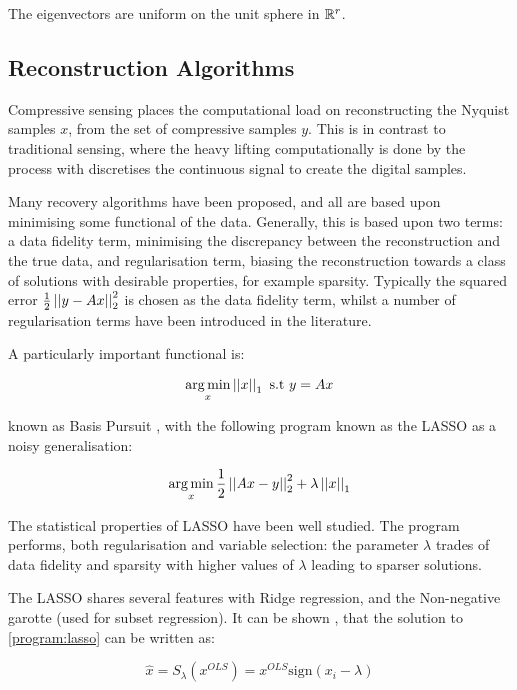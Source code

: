 The eigenvectors are uniform on the unit sphere in \({\mathbb{R}}^{r}\).

\subsection{Reconstruction Algorithms}
Compressive sensing places the computational load on reconstructing the Nyquist samples \(x\), from the set of compressive samples \(y\). This is in contrast to traditional sensing, where the heavy lifting computationally is done by the process with discretises the continuous signal to create the digital samples. 

Many recovery algorithms have been proposed, and all are based upon minimising some functional of the data. Generally, this is based upon two terms: a data fidelity term, minimising the discrepancy between the reconstruction and the true data, and regularisation term, biasing the reconstruction towards a class of solutions with desirable properties, for example sparsity. Typically the squared error \( \frac{1}{2}\left|\left|y-Ax\right|\right|_2^2 \) is chosen as the data fidelity term, whilst a number of regularisation terms have been introduced in the literature. 

A particularly important functional is:

\begin{equation}
\operatorname*{arg\,min}_x \left|\left|x\right|\right|_1 \text{ s.t } y=Ax
\label{program:bp}
\end{equation}

known as Basis Pursuit \cite{Chen1998a}, with the following program known as the LASSO \cite{tibshirani1996regression} as a noisy generalisation: 

\begin{equation}
\operatorname*{arg\,min}_x \frac{1}{2}\left|\left|Ax-y\right|\right|_2^2 + \lambda\left|\left|x\right|\right|_1
\label{program:lasso}
\end{equation}

The statistical properties of LASSO have been well studied. The program performs, both regularisation and variable selection: the parameter \(\lambda\) trades of data fidelity and sparsity with higher values of \(\lambda\) leading to sparser solutions. 

The LASSO shares several features with Ridge regression, and the Non-negative garotte (used for subset regression). It can be shown \cite{hastie2005elements}, that the solution to \eqref{program:lasso} can be written as:

\begin{equation}
\hat{x} = S_{\lambda}\left(x^{OLS}\right) = x^{OLS} \mathrm{sign}\left(x_i - \lambda\right)
\label{soln:lasso}
\end{equation} 

